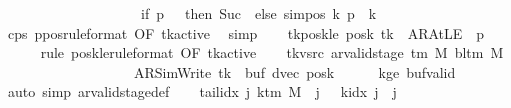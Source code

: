 \begin{isabellebody}
\ \ \ \ \ \ \ \ \ \ \ \ \ \ \ \ \ \ \ {\isacharequal}{\kern0pt}\ {\isacharparenleft}{\kern0pt}if\ {\isacharquery}{\kern0pt}p\ {\isacharequal}{\kern0pt}\ {}\ then\ Suc\ {}\ else\ sim{\isacharunderscore}{\kern0pt}pos\ {\isacharquery}{\kern0pt}k\ {\isacharquery}{\kern0pt}p\ {\isacharplus}{\kern0pt}\ {\isacharquery}{\kern0pt}k{\isacharparenright}{\kern0pt}{\isachardoublequoteclose}\isanewline
\ \ \ \ \isamarkupfalse%
\ c{\isacharunderscore}{\kern0pt}ps\ ppos{\isacharbrackleft}{\kern0pt}rule{\isacharunderscore}{\kern0pt}format{\isacharcomma}{\kern0pt}\ OF\ tk{\isacharunderscore}{\kern0pt}active{\isacharbrackright}{\kern0pt}\ \isamarkupfalse%
\ simp\isanewline
\ \ \isamarkupfalse%
\ tk{\isacharunderscore}{\kern0pt}poskle{\isacharcolon}{\kern0pt}\ {\isachardoublequoteopen}posk\ {\isacharquery}{\kern0pt}tk\ {\isacharequal}{\kern0pt}\ AR{\isacharunderscore}{\kern0pt}AtLE\ {\isasymlongleftrightarrow}\ {\isacharquery}{\kern0pt}p\ {\isacharequal}{\kern0pt}\ {}{\isachardoublequoteclose}\isanewline
\ \ \ \ \isamarkupfalse%
\ {\isacharparenleft}{\kern0pt}rule\ poskle{\isacharbrackleft}{\kern0pt}rule{\isacharunderscore}{\kern0pt}format{\isacharcomma}{\kern0pt}\ OF\ tk{\isacharunderscore}{\kern0pt}active{\isacharbrackright}{\kern0pt}{\isacharparenright}{\kern0pt}\isanewline
\ \ \isamarkupfalse%
\ tk{\isacharunderscore}{\kern0pt}vsrc{\isacharcolon}{\kern0pt}\ {\isachardoublequoteopen}ar{\isacharunderscore}{\kern0pt}valid{\isacharunderscore}{\kern0pt}stage\ {\isacharparenleft}{\kern0pt}{\isasymGamma}{\isacharunderscore}{\kern0pt}tm\ M{\isacharparenright}{\kern0pt}\ {\isacharparenleft}{\kern0pt}bl{\isacharunderscore}{\kern0pt}tm\ M{\isacharparenright}{\kern0pt}\isanewline
\ \ \ \ \ \ \ \ \ \ \ \ \ \ \ \ \ \ \ {\isacharparenleft}{\kern0pt}AR{\isacharunderscore}{\kern0pt}SimWrite{\isacharcomma}{\kern0pt}\ {\isacharquery}{\kern0pt}tk{\isacharcomma}{\kern0pt}\ {}{\isacharcomma}{\kern0pt}\ buf{\isacharcomma}{\kern0pt}\ dvec{\isacharcomma}{\kern0pt}\ posk{\isacharparenright}{\kern0pt}{\isachardoublequoteclose}\isanewline
\ \ \ \ \isamarkupfalse%
\ kge{}\ buf{\isacharunderscore}{\kern0pt}valid\ \isamarkupfalse%
\ {\isacharparenleft}{\kern0pt}auto\ simp{\isacharcolon}{\kern0pt}\ ar{\isacharunderscore}{\kern0pt}valid{\isacharunderscore}{\kern0pt}stage{\isacharunderscore}{\kern0pt}def{\isacharparenright}{\kern0pt}\isanewline
\ \ \isamarkupfalse%
\ tail{\isacharunderscore}{\kern0pt}idx{\isacharcolon}{\kern0pt}\ {\isachardoublequoteopen}{\isasymAnd}j{\isacharprime}{\kern0pt}{\isachardot}{\kern0pt}\ k{\isacharunderscore}{\kern0pt}tm\ M\ {\isasymle}\ j{\isacharprime}{\kern0pt}\ {\isasymLongrightarrow}\ {\isasymnot}\ k{\isacharunderscore}{\kern0pt}idx\ j{\isacharprime}{\kern0pt}\ {\isacharless}{\kern0pt}\ j{\isachardoublequoteclose}\isanewline

\end{isabellebody}
